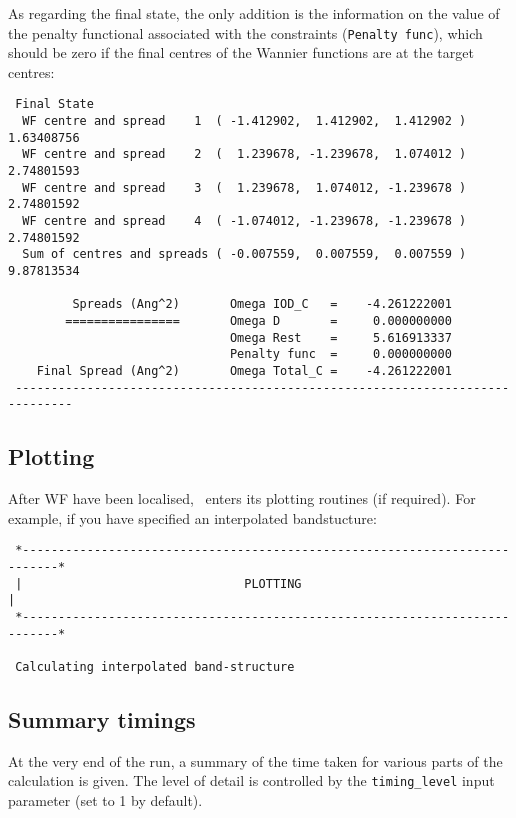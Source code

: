 As regarding the final state, the only addition is the information on the value
of the penalty functional associated with the constraints ({\tt Penalty func}),
 which should be zero if the final centres
of the Wannier functions are at the target centres:
\begin{verbatim}
 Final State
  WF centre and spread    1  ( -1.412902,  1.412902,  1.412902 )     1.63408756
  WF centre and spread    2  (  1.239678, -1.239678,  1.074012 )     2.74801593
  WF centre and spread    3  (  1.239678,  1.074012, -1.239678 )     2.74801592
  WF centre and spread    4  ( -1.074012, -1.239678, -1.239678 )     2.74801592
  Sum of centres and spreads ( -0.007559,  0.007559,  0.007559 )     9.87813534

         Spreads (Ang^2)       Omega IOD_C   =    -4.261222001
        ================       Omega D       =     0.000000000
                               Omega Rest    =     5.616913337
                               Penalty func  =     0.000000000
    Final Spread (Ang^2)       Omega Total_C =    -4.261222001
 ------------------------------------------------------------------------------
\end{verbatim}


\subsection{Plotting}

After WF have been localised, \wannier\ enters its plotting routines
(if required). For example, if you have specified an interpolated
bandstucture: 

\begin{verbatim}
 *---------------------------------------------------------------------------*
 |                               PLOTTING                                    |
 *---------------------------------------------------------------------------*
  
 Calculating interpolated band-structure
\end{verbatim}

\subsection{Summary timings}

At the very end of the run, a summary of the time taken for various
parts of the calculation is given. The level of detail is controlled
by the {\tt timing\_level} input parameter (set to 1 by default).

